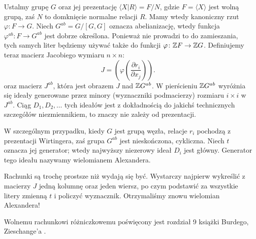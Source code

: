 Ustalmy grupę $G$ oraz jej prezentację $\langle X | R \rangle = F/N$, gdzie $F = \langle X \rangle$ jest wolną grupą, zaś $N$ to domknięcie normalne relacji $R$.
Mamy wtedy kanoniczny rzut $\varphi \colon F \to G$.
Niech $G^{ab} = G/[G, G]$ oznacza abelianizację, wtedy funkcja $\varphi^{ab} \colon F \to G^{ab}$ jest dobrze określona.
Ponieważ nie prowadzi to do zamieszania, tych samych liter będziemy używać także do funkcji $\varphi \colon \mathbb Z F \to \mathbb Z G$.
Definiujemy teraz macierz Jacobiego wymiaru $n \times n$:
%
\begin{equation}
    J = \left(\varphi \left(\frac{\partial r_i}{\partial x_j}\right) \right).
\end{equation}
oraz macierz $J^{ab}$, która jest obrazem $J$ nad $\mathbb Z G^{ab}$.
W pierścieniu $\mathbb Z G^{ab}$ wyróżnia się ideały generowane przez minory (wyznaczniki podmacierzy) rozmiaru $i \times i$ w $J^{ab}$.
Ciąg $D_1, D_2, \ldots$ tych ideałów jest z dokładnością do jakichś technicznych szczegółów niezmiennikiem, to znaczy nie zależy od prezentacji.

W szczególnym przypadku, kiedy $G$ jest grupą węzła, relacje $r_i$ pochodzą z prezentacji Wirtingera, zaś grupa $G^{ab}$ jest nieskończona, cykliczna.
Niech $t$ oznacza jej generator; wtedy najwyższy niezerowy ideał $D_i$ jest główny.
Generator tego ideału nazywamy wielomianem Alexandera.
%

Rachunki są trochę prostsze niż wydają się być.
Wystarczy najpierw wykreślić z macierzy $J$ jedną kolumnę oraz jeden wiersz, po czym podstawić za wszystkie litery zmienną $t$ i policzyć wyznacznik.
Otrzymaliśmy znowu wielomian Alexandera!

Wolnemu rachunkowi różniczkowemu poświęcony jest rozdział 9 książki Burdego, Zieschange'a \cite[s. 140-160]{burde2014}.

%


